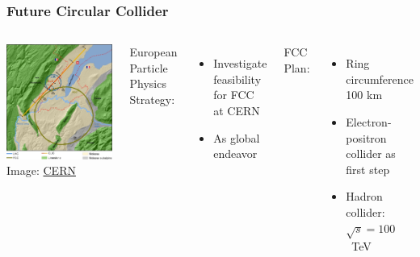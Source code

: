 \documentclass{beamer}
\newcommand{\bluetext}[1]{%
  \textcolor{myBlue}{#1}
}
\begin{document}
\begin{frame}
  \frametitle{Future Circular Collider}

  \begin{columns}[c]
    \includegraphics[width=\linewidth]{figures/FCC_CLIC.png}
    \vspace{-10mm}
    \tiny{Image: \href{https://alumni.cern/news/226282}{CERN}}

    \bluetext{European Particle Physics Strategy:}
    \begin{itemize}
      \item Investigate feasibility for FCC at CERN
      \item As global endeavor
    \end{itemize}

    \bluetext{FCC Plan:}
    \begin{itemize}
      \item Ring circumference 100 km
      \item Electron-positron collider as first step
      \item Hadron collider: $\sqrt{s} = 100$~TeV
    \end{itemize}
  \end{columns}
\end{frame}
\end{document}
